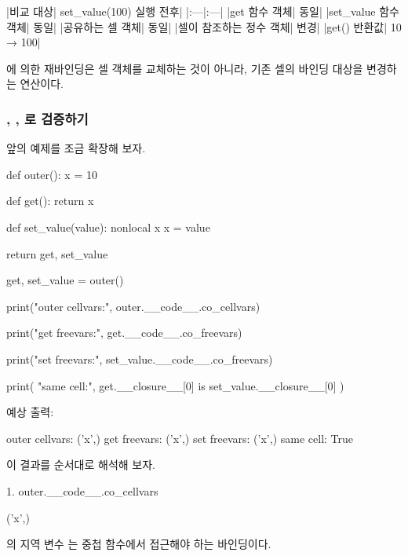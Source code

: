 \begin{dhktable}
|비교 대상|	set_value(100) 실행 전후|
|:---|:---|
|get 함수 객체|	동일|
|set_value 함수 객체|	동일|
|공유하는 셀 객체|	동일|
|셀이 참조하는 정수 객체|	변경|
|get() 반환값|	10 → 100|
\end{dhktable}

에 의한 재바인딩은 셀 객체를 교체하는 것이 아니라, 기존 셀의 바인딩 대상을 변경하는 연산이다.

\subsubsection{, , 로 검증하기}

앞의 예제를 조금 확장해 보자.

\begin{dhkcode}
def outer():
    x = 10

    def get():
        return x

    def set_value(value):
        nonlocal x
        x = value

    return get, set_value


get, set_value = outer()

print("outer cellvars:", outer.__code__.co_cellvars)

print("get freevars:", get.__code__.co_freevars)

print("set freevars:", set_value.__code__.co_freevars)

print(
    "same cell:",
    get.__closure__[0] is set_value.__closure__[0]
)
\end{dhkcode}

예상 출력:

\begin{dhkzsh}
outer cellvars: ('x',)
get freevars: ('x',)
set freevars: ('x',)
same cell: True
\end{dhkzsh}

이 결과를 순서대로 해석해 보자.

\begin{dhknote}
\begin{dhksmry}[centered]
1. outer.__code__.co_cellvars
\end{dhksmry}
\end{dhknote}

\begin{dhkzsh}
('x',)
\end{dhkzsh}

의 지역 변수 는 중첩 함수에서 접근해야 하는 바인딩이다.

